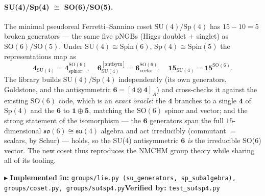 \documentclass[11pt]{article}
\newcommand{\so}[1]{\mathfrak{so}(#1)}
\newcommand{\SO}[1]{\mathrm{SO}(#1)}
\newcommand{\SU}[1]{\mathrm{SU}(#1)}
\newcommand{\Sp}[1]{\mathrm{Sp}(#1)}
\newcommand{\code}[1]{\texttt{#1}}
\newcommand{\impl}[2]{\par\smallskip\noindent\textcolor{blue!60!black}{\small$\blacktriangleright$ \textbf{Implemented in:} \code{#1}\quad\textbf{Verified by:} \code{#2}}\par\smallskip}
\begin{document}
\paragraph{SU(4)/Sp(4) $\cong$ SO(6)/SO(5).}
The minimal pseudoreal Ferretti--Sannino coset $\SU4/\Sp4$ has $15-10=5$ broken generators --- the
same five pNGBs (Higgs doublet $+$ singlet) as $\SO6/\SO5$. Under $\SU4\cong\mathrm{Spin}(6)$,
$\Sp4\cong\mathrm{Spin}(5)$ the representations map as
\begin{equation}
  \mathbf 4_{\SU4}=\mathbf 4_{\text{spinor}}^{\SO6},\quad
  \mathbf 6_{\SU4}^{[\text{antisym}]}=\mathbf 6_{\text{vector}}^{\SO6},\quad
  \mathbf{15}_{\SU4}=\mathbf{15}^{\SO6}.
\end{equation}
The library builds $\SU4/\Sp4$ independently (its own generators, Goldstone, and the antisymmetric
$\mathbf 6=[\mathbf4\otimes\mathbf4]_A$) and cross-checks it against the existing $\SO6$ code, which
is an \emph{exact oracle}: the $\mathbf4$ branches to a single $\mathbf4$ of $\Sp4$ and the
$\mathbf6$ to $\mathbf1\oplus\mathbf5$, matching the $\SO6$ spinor and vector; and the strong
statement of the isomorphism --- the $\mathbf6$ generators span the full $15$-dimensional
$\so6\cong\mathfrak{su}(4)$ algebra and act irreducibly (commutant $=$ scalars, by Schur) --- holds,
so the SU(4) antisymmetric $\mathbf6$ \emph{is} the irreducible SO(6) vector. The new coset thus
reproduces the NMCHM group theory while sharing all of its tooling.
\impl{groups/lie.py (su\_generators, sp\_subalgebra), groups/coset.py, groups/su4sp4.py}{test\_su4sp4.py}
\end{document}
